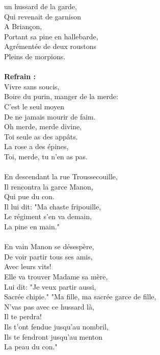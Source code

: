 
 un hussard de la garde,
\\Qui revenait de garnison
\\A Briançon,
\\Portant sa pine en hallebarde,
\\Agrémentée de deux roustons
\\Pleins de morpions.
\\\\\textbf{Refrain :}
\\Vivre sans soucis,
\\Boire du purin, manger de la merde:
\\C'est le seul moyen
\\De ne jamais mourir de faim.
\\Oh merde, merde divine,
\\Toi seule as des appâts.
\\La rose a des épines,
\\Toi, merde, tu n'en as pas.
\\\\En descendant la rue Troussecouille,
\\Il rencontra la garce Manon,
\\Qui pue du con.
\\Il lui dit: "Ma chaste fripouille,
\\Le régiment s'en va demain,
\\La pine en main."
\\\\En vain Manon se désespère,
\\De voir partir tous ses amis,
\\Avec leurs vits!
\\Elle va trouver Madame sa mère,
\\Lui dit: "Je veux partir aussi,
\\Sacrée chipie."
\breakpage
"Ma fille, ma sacrée garce de fille,
\\N'vas pas avec ce hussard là,
\\Il te perdra!
\\Ils t'ont fendue jusqu'au nombril,
\\Ils te fendront jusqu'au menton
\\La peau du con."

